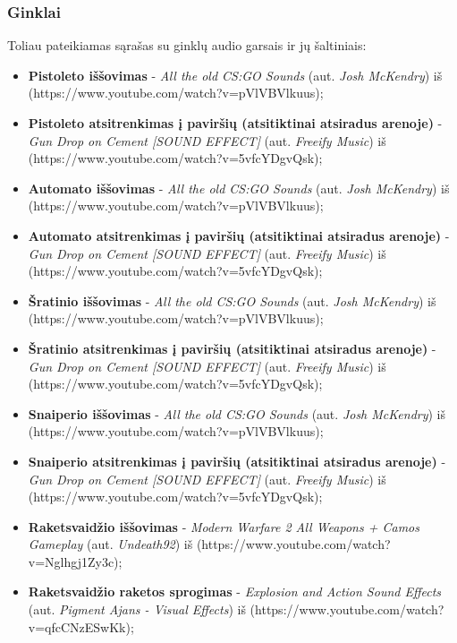 \documentclass{VUMIFPSkursinis}
\begin{document}
\subsubsection{Ginklai}
Toliau pateikiamas sąrašas su ginklų audio garsais ir jų šaltiniais:
\begin{itemize}
    \item \textbf{Pistoleto iššovimas} - \textit{All the old CS:GO Sounds} (aut. \textit{Josh McKendry}) iš (https://www.youtube.com/watch?v=pVlVBVlkuus);
    \item \textbf{Pistoleto atsitrenkimas į paviršių (atsitiktinai atsiradus arenoje)} - \textit{Gun Drop on Cement [SOUND EFFECT]} (aut. \textit{Freeify Music}) iš (https://www.youtube.com/watch?v=5vfcYDgvQsk);
    \item \textbf{Automato iššovimas} - \textit{All the old CS:GO Sounds} (aut. \textit{Josh McKendry}) iš (https://www.youtube.com/watch?v=pVlVBVlkuus);
    \item \textbf{Automato atsitrenkimas į paviršių (atsitiktinai atsiradus arenoje)} - \textit{Gun Drop on Cement [SOUND EFFECT]} (aut. \textit{Freeify Music}) iš (https://www.youtube.com/watch?v=5vfcYDgvQsk);
    \item \textbf{Šratinio iššovimas} - \textit{All the old CS:GO Sounds} (aut. \textit{Josh McKendry}) iš (https://www.youtube.com/watch?v=pVlVBVlkuus);
    \item \textbf{Šratinio atsitrenkimas į paviršių (atsitiktinai atsiradus arenoje)} - \textit{Gun Drop on Cement [SOUND EFFECT]} (aut. \textit{Freeify Music}) iš (https://www.youtube.com/watch?v=5vfcYDgvQsk);
    \item \textbf{Snaiperio iššovimas} - \textit{All the old CS:GO Sounds} (aut. \textit{Josh McKendry}) iš (https://www.youtube.com/watch?v=pVlVBVlkuus);
    \item \textbf{Snaiperio atsitrenkimas į paviršių (atsitiktinai atsiradus arenoje)} - \textit{Gun Drop on Cement [SOUND EFFECT]} (aut. \textit{Freeify Music}) iš (https://www.youtube.com/watch?v=5vfcYDgvQsk);
    \item \textbf{Raketsvaidžio iššovimas} - \textit{Modern Warfare 2 All Weapons + Camos Gameplay} (aut. \textit{Undeath92}) iš (https://www.youtube.com/watch?v=Nglhgj1Zy3c);
    \item \textbf{Raketsvaidžio raketos sprogimas} - \textit{Explosion and Action Sound Effects} (aut. \textit{Pigment Ajans - Visual Effects}) iš (https://www.youtube.com/watch?v=qfcCNzESwKk);

\end{itemize}
\end{document}

